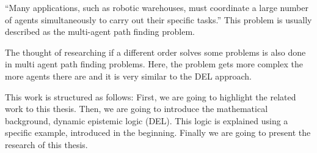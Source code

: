 
``Many applications, such as robotic warehouses, must coordinate a large number of agents simultaneously to carry out their specific tasks.'' This problem is usually described as the multi-agent path finding problem.

The thought of researching if a different order solves some problems is also done in multi agent path finding problems. Here, the problem gets more complex the more agents there are and it is very similar to the DEL approach.

This work is structured as follows:
First, we are going to highlight the related work to this thesis. Then, we are going to introduce the mathematical background, dynamic epistemic logic (DEL). This logic is explained using a specific example, introduced in the beginning. Finally we are going to present the research of this thesis.
